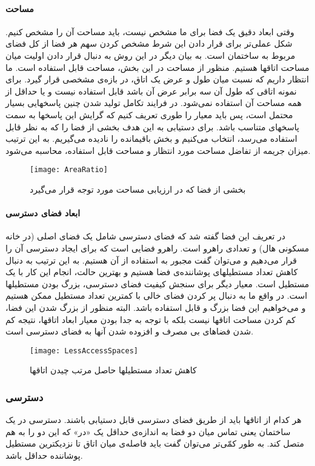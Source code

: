 \documentclass{report}
\begin{document}
\paragraph{مساحت}
وقتی ابعاد دقیق یک فضا برای ما مشخص نیست، باید مساحت آن را مشخص کنیم. شکل عملی‌تر برای قرار دادن این شرط مشخص کردن سهم هر فضا از کل فضای مربوط به ساختمان است. به بیان دیگر در این روش به دنبال قرار دادن اولیت میان مساحت اتاقها هستیم.
منظور از مساحت در این بخش، مساحت قابل استفاده است. ما انتظار داریم که نسبت میان طول و عرض یک اتاق، در بازه‌ی مشخصی قرار گیرد. برای نمونه اتاقی که طول آن سه برابر عرض آن باشد قابل استفاده نیست و یا حداقل از همه مساحت آن استفاده نمی‌شود. در فرایند تکامل تولید شدن چنین پاسخهایی بسیار محتمل است، پس باید معیار را طوری تعریف کنیم که گرایش این پاسخها به سمت پاسخهای متناسب باشد. برای دستیابی به این هدف بخشی از فضا را که به نظر قابل استفاده می‌رسد، انتخاب می‌کنیم و بخش باقیمانده را نادیده می‌گیریم. به این ترتیب میزان جریمه از تفاضل مساحت مورد انتظار و مساحت قابل استفاده، محاسبه می‌شود.

\begin{figure}[h] \centerline{\texttt{[image: AreaRatio]}} \caption{\label{fAreaRatio}
بخشی از فضا که در ارزیابی مساحت مورد توجه قرار می‌گیرد
 } \end{figure}

\paragraph{ابعاد فضای دسترسی}
در تعریف این فضا گفته شد که فضای دسترسی شامل یک فضای اصلی (در خانه مسکونی هال) و تعدادی راهرو است. راهرو فضایی است که برای ایجاد دسترسی آن را قرار می‌دهیم و می‌توان گفت مجبور به استفاده از آن هستیم. به این ترتیب به دنبال کاهش تعداد مستطیلهای پوشاننده‌ی فضا هستیم و بهترین حالت، انجام این کار با یک مستطیل است. معیار دیگر برای سنجش کیفیت فضای دسترسی، بزرگ بودن مستطیلها است.
در واقع ما به دنبال پر کردن فضای خالی با کمترین تعداد مستطیل ممکن هستیم و می‌خواهیم این فضا بزرگ و قابل استفاده باشد. البته منظور از بزرگ شدن این فضا، کم کردن مساحت اتاقها نیست بلکه با توجه به جدا بودن معیار ابعاد اتاقها، نتیجه کم شدن فضاهای بی مصرف و افزوده شدن آنها به فضای دسترسی است.

\begin{figure}[h] \centerline{\texttt{[image: LessAccessSpaces]}} \caption{\label{fLessAccessSpaces}
کاهش تعداد مستطیلها حاصل مرتب چیدن اتاقها
 } \end{figure}

\subsubsection{دسترسی}
هر کدام از اتاقها باید از طریق فضای دسترسی قابل دستیابی باشند. دسترسی در یک ساختمان یعنی تماس میان دو فضا به اندازه‌ی حداقل یک «در» که این دو را به هم متصل کند. به طور کمّی‌تر می‌توان گفت باید فاصله‌ی میان اتاق تا نزدیکترین مستطیل پوشاننده حداقل باشد.
\end{document}
